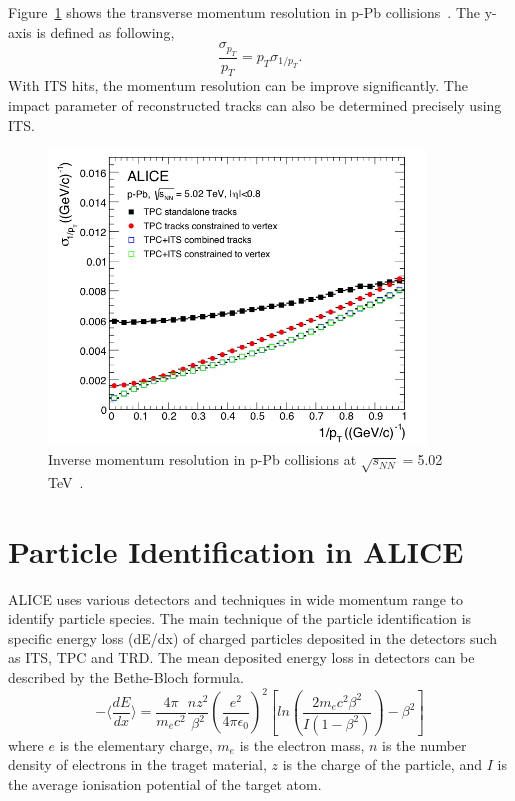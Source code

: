 Figure~\ref{fig_3_momreso} shows the transverse momentum resolution in p-Pb collisions~\cite{bib_aprrun1}.
The y-axis is defined as following, 
\begin{equation}
  \frac{\sigma_{p_{T}}}{p_{T}} = p_{T}\sigma_{1/p_{T}}.
\end{equation}
With ITS hits, the momentum resolution can be improve significantly. 
The impact parameter of reconstructed tracks can also be determined precisely using ITS. %
\begin{figure}[!h]
  \centering
  \includegraphics[width=10cm]{chap3/figure/TrackReconstruction/MomReso_pPb.png}
  \caption{Inverse momentum resolution in p-Pb collisions at $\sqrt{s_{NN}}=$5.02 TeV~\cite{bib_aprrun1}.}
  \label{fig_3_momreso}
\end{figure}


\section{Particle Identification in ALICE}
\label{sec_3_pid}
ALICE uses various detectors and techniques in wide momentum range to identify particle species. 
The main technique of the particle identification is specific energy loss (dE/dx) of charged particles deposited in the detectors such as ITS, TPC and TRD.
The mean deposited energy loss in detectors can be described by the Bethe-Bloch formula.
\begin{equation}
  -\langle \frac{dE}{dx}\rangle = \frac{4\pi}{m_{e}c^{2}} \frac{nz^{2}}{\beta^{2}} ( \frac{e^{2}}{4\pi\epsilon_{0}} )^{2} [ ln( \frac{2m_{e}c^{2}\beta^{2}}{I(1-\beta^{2})} ) - \beta^{2} ]
\end{equation}
where $e$ is the elementary charge, $m_{e}$ is the electron mass, $n$ is the number density of electrons in the traget material, $z$ is the charge of the particle, and $I$ is the average ionisation potential of the target atom. 

